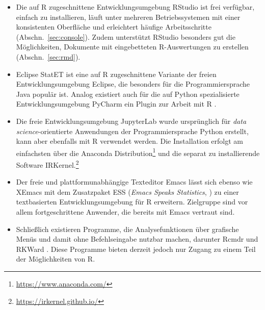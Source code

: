 \begin{itemize}
\item Die auf R zugeschnittene Entwicklungsumgebung RStudio \cite{Allaire2011} ist frei verfügbar, einfach zu installieren, läuft unter mehreren Betriebssystemen mit einer konsistenten Oberfläche und erleichtert häufige Arbeitsschritte (Abschn.\ \ref{sec:console}). Zudem unterstützt RStudio besonders gut die Möglichkeiten, Dokumente mit eingebetteten R-Auswertungen zu erstellen (Abschn.\ \ref{sec:rmd}).
\item Eclipse StatET \cite{Wahlbrink2008} ist eine auf R zugeschnittene Variante der freien Entwicklungsumgebung Eclipse, die besonders für die Programmiersprache Java populär ist. Analog existiert auch für die auf Python spezialisierte Entwicklungsumgebung PyCharm ein Plugin zur Arbeit mit R \cite{JetBrains2020}.
\item Die freie Entwicklungsumgebung JupyterLab \cite{Kluyver2016} wurde ursprünglich für \emph{data science}-orientierte Anwendungen der Programmiersprache Python erstellt, kann aber ebenfalls mit R verwendet werden. Die Installation erfolgt am einfachsten über die Anaconda Distribution\footnote{\url{https://www.anaconda.com/}} und die separat zu installierende Software IRKernel.\footnote{\url{https://irkernel.github.io/}}
\item Der freie und plattformunabhängige Texteditor Emacs lässt sich ebenso wie XEmacs mit dem Zusatzpaket ESS (\emph{Emacs Speaks Statistics}, ) zu einer textbasierten Entwicklungsumgebung für R erweitern. Zielgruppe sind vor allem fortgeschrittene Anwender, die bereits mit Emacs vertraut sind.
\item Schließlich existieren Programme, die Analysefunktionen über grafische Menüs und damit ohne Befehlseingabe nutzbar machen, darunter Rcmdr \cite{Fox2017} und RKWard \cite{Roediger2012}. Diese Programme bieten derzeit jedoch nur Zugang zu einem Teil der Möglichkeiten von R.
\end{itemize}

